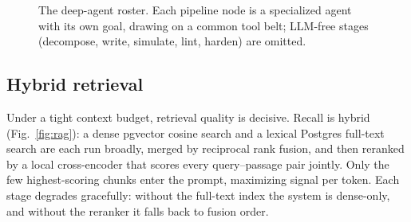 \documentclass[conference]{IEEEtran}
\begin{document}
\begin{figure}[t]
\centering
{}
\caption{The deep-agent roster. Each pipeline node is a specialized agent with its own goal,
drawing on a common tool belt; LLM-free stages (decompose, write, simulate, lint, harden)
are omitted.}
\label{fig:roster}
\end{figure}

\subsection{Hybrid retrieval}
Under a tight context budget, retrieval quality is decisive. Recall is hybrid
(Fig.~\ref{fig:rag}): a dense pgvector cosine search and a lexical Postgres
full-text search are each run broadly, merged by reciprocal rank fusion, and then
reranked by a local cross-encoder that scores every query--passage pair jointly.
Only the few highest-scoring chunks enter the prompt, maximizing signal per
token. Each stage degrades gracefully: without the full-text index the system is
dense-only, and without the reranker it falls back to fusion order.
\end{document}
